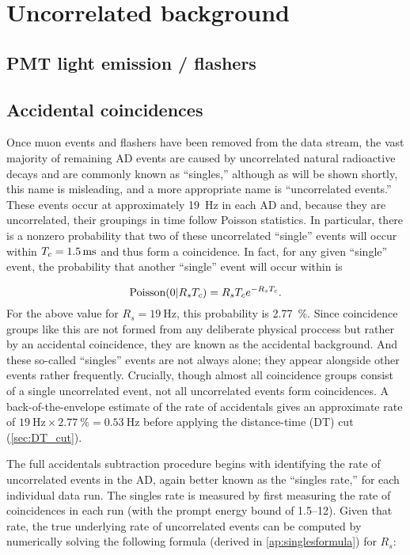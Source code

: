 \section{Uncorrelated background}

\subsection{PMT light emission / flashers}
\label{subsec:flashers}


\subsection{Accidental coincidences}
\label{subsec:acc}

Once muon events and flashers have been removed from the data stream,
the vast majority of remaining AD events are caused by uncorrelated
natural radioactive decays and are commonly known as ``singles,''
although as will be shown shortly, this name is misleading,
and a more appropriate name is ``uncorrelated events.''
These events occur at approximately \SI{19}{\hertz} in each AD and,
because they are uncorrelated, their groupings in time follow Poisson statistics.
In particular, there is a nonzero probability that
two of these uncorrelated ``single'' events will occur within
$T_c=\SI{1.5}{\milli\second}$ and thus form a  coincidence.
In fact, for any given ``single'' event, the probability that
another ``single'' event will occur within \tc{} is

\begin{equation}
    \text{Poisson}(0\vert R_sT_c) = R_sT_c e^{-R_sT_c}.
\end{equation}
For the above value for $R_s=\SI{19}{\hertz}$, this probability is \SI{2.77}{\percent}.
Since  coincidence groups like this are not formed from any
deliberate physical proccess but rather by an accidental coincidence,
they are known as the accidental background.
And these so-called ``singles'' events are not always alone;
they appear alongside other events rather frequently.
Crucially, though almost all  coincidence groups
consist of a single uncorrelated event,
not all uncorrelated events form  coincidences.
A back-of-the-envelope estimate of the rate of accidentals
gives an approximate rate of
$\SI{19}{\hertz}\times\SI{2.77}{\percent}=\SI{0.53}{\hertz}$
before applying the distance-time (DT) cut (\cref{sec:DT_cut}).

The full accidentals subtraction procedure begins with identifying
the rate of uncorrelated events in the AD, again better known
as the ``singles rate,'' for each individual data run.
The singles rate is measured by first measuring the rate of
 coincidences in each run
(with the prompt energy bound of \SIrange{1.5}{12}{\mev}).
Given that rate, the true underlying rate of uncorrelated events can be
computed by numerically solving the following formula
(derived in \cref{ap:singlesformula}) for $R_s$:

